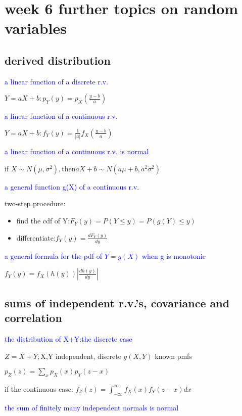 \section*{week 6 further topics on random variables}

\subsection*{derived distribution}

\textcolor{blue}{a linear function of a discrete r.v.}

$Y=a X+b:p_Y(y)=p_X(\frac{y-b}{a})$


\textcolor{blue}{a linear function of a continuous r.v.}

$Y=a X+b:f_Y(y)=\frac{1}{|a|}f_X(\frac{y-b}{a})$

\textcolor{blue}{a linear function of a continuous r.v. is normal}

if $X\sim N(\mu,\sigma^2),\text{then} a X+b \sim N(a\mu+b,a^2\sigma^2)$


\textcolor{blue}{a general function g(X) of a continuous r.v.}

two-step procedure:

\begin{itemize}
    \item find the cdf of Y:$F_Y(y)=P(Y\le y)=P(g(Y)\le y)$
    \item differentiate:$f_Y(y)=\frac{d F_Y(y)}{dy}$
\end{itemize}

\textcolor{blue}{a general formula for the pdf of $Y=g(X)$ when g is monotonic}

$f_Y(y)=f_X(h(y))|\frac{dh(y)}{dy}|$






\subsection*{sums of independent r.v.'s, covariance and correlation}

\textcolor{blue}{the distribution of X+Y:the discrete case}

$Z=X+Y;$X,Y independent, discrete $g(X,Y)$ known pmfs

$p_Z(z)=\sum_xp_X(x)p_Y(z-x)$

if the continuous case:
$f_Z(z)=\int_{-\infty}^\infty f_X(x)f_Y(z-x)dx$


\textcolor{blue}{the sum of finitely many independent normals is normal}

